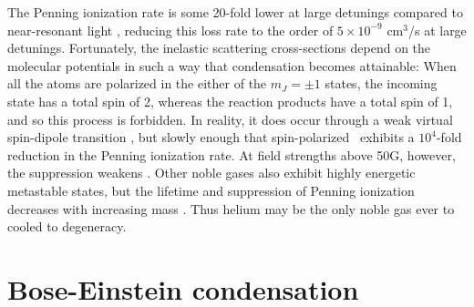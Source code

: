 	The Penning ionization rate is some 20-fold lower at large detunings compared to near-resonant light \cite{Mastwijk98}, reducing this loss rate to the order of $5\times10^{-9}$ cm$^3$/s at large detunings.
	Fortunately, the inelastic scattering cross-sections depend on the molecular potentials in such a way that condensation becomes attainable: When all the atoms are polarized in the either of the $m_J=\pm1$ states, the incoming state has a total spin of 2, whereas the reaction products have a total spin of 1, and so this process is forbidden.
	In reality, it does occur through a weak virtual spin-dipole transition \cite{Shlyapnikov94}, but slowly enough that spin-polarized \mhe~exhibits a $10^4$-fold reduction in the Penning ionization rate.
	At field strengths above 50G, however, the suppression weakens \cite{Shlyapnikov94,Borbely12}.
	Other noble gases also exhibit highly energetic metastable states, but the lifetime and suppression of Penning ionization decreases with increasing mass \cite{Orzel99, Spoden05}.
	Thus helium may be the only noble gas ever to cooled to degeneracy.
	

	
	
\section{Bose-Einstein condensation}
\label{sec:BEC_theory}

